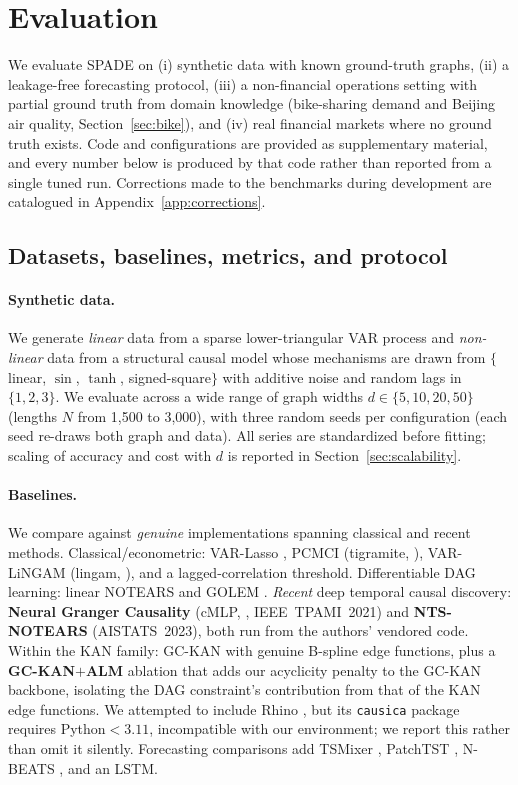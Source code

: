 
\section{Evaluation}
\label{sec:results}

We evaluate SPADE on (i) synthetic data with known ground-truth graphs, (ii) a
leakage-free forecasting protocol, (iii) a non-financial operations setting
with partial ground truth from domain knowledge (bike-sharing demand and
Beijing air quality, Section~\ref{sec:bike}), and (iv) real financial markets where no ground truth
exists. Code and configurations are provided as supplementary material, and every
number below is produced by that code rather than reported from a single tuned
run. Corrections made to the benchmarks during development are
catalogued in Appendix~\ref{app:corrections}.

\subsection{Datasets, baselines, metrics, and protocol}
\label{sec:setup}

\paragraph{Synthetic data.} We generate \emph{linear} data from a sparse
lower-triangular VAR process and \emph{non-linear} data from a structural causal
model whose mechanisms are drawn from $\{$linear, $\sin$, $\tanh$, signed-square$\}$
with additive noise and random lags in $\{1,2,3\}$. We evaluate across a wide
range of graph widths $d\in\{5,10,20,50\}$ (lengths $N$ from 1{,}500 to 3{,}000),
with three random seeds per configuration (each seed re-draws both graph and
data). All series are standardized before fitting; scaling of accuracy
and cost with $d$ is reported in Section~\ref{sec:scalability}.

\paragraph{Baselines.} We compare against \emph{genuine} implementations spanning
classical and recent methods. Classical/econometric: VAR-Lasso
\citep{Tibshirani1996}, PCMCI (tigramite, \citealt{Runge2019}), VAR-LiNGAM
(lingam, \citealt{Hyvarinen2010}), and a lagged-correlation threshold.
Differentiable DAG learning: linear NOTEARS \citep{Zheng2018} and GOLEM
\citep{ng2020golem}. \emph{Recent} deep temporal causal discovery: \textbf{Neural
Granger Causality} (cMLP, \citealt{Tank2021}, IEEE~TPAMI~2021) and
\textbf{NTS-NOTEARS} \citep{sun2023ntsnotears} (AISTATS~2023), both run from the
authors' vendored code. Within the KAN family: GC-KAN \citep{GCKAN2024} with
genuine B-spline edge functions, plus a \textbf{GC-KAN$+$ALM} ablation that adds
our acyclicity penalty to the GC-KAN backbone, isolating the DAG constraint's
contribution from that of the KAN edge functions. We attempted to include Rhino
\citep{Gong2023Rhino}, but its \texttt{causica} package requires Python${<}3.11$,
incompatible with our environment; we report this rather than omit it silently.
Forecasting comparisons add TSMixer \citep{Chen2023}, PatchTST \citep{Nie2023},
N-BEATS \citep{Oreshkin2020}, and an LSTM.

